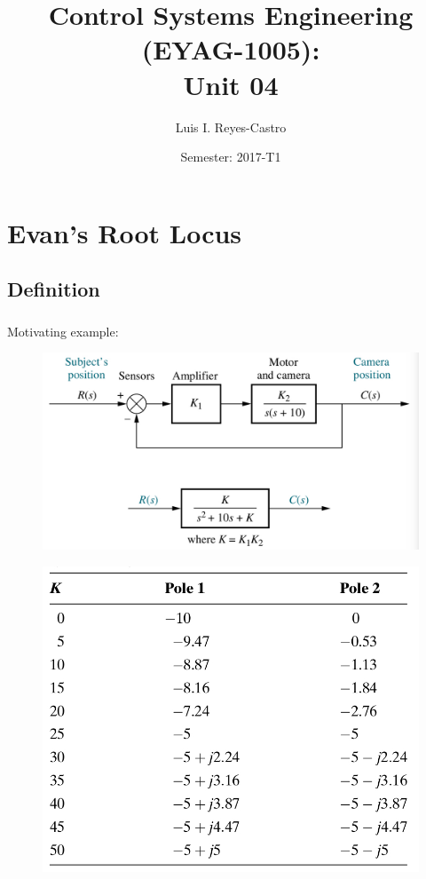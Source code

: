 \documentclass[ 10pt, xcolor = dvipsnames]{beamer}
\title[\shorttitle]{Control Systems Engineering (EYAG-1005): \\ \textbf{Unit 04} }
\author[L. I. Reyes-Castro]{Luis I. Reyes-Castro}
\institute[ESPOL]{\normalsize Escuela Superior Polit\'ecnica del Litoral (ESPOL) \\ Guayaquil - Ecuador}
\date[2017-T1]{Semester: 2017-T1}
\begin{document}



\section{Evan's Root Locus}

\subsection{Definition}

\begin{frame}[allowframebreaks]
\frametitle{\insertsection}

Motivating example: 
\fullskip

\begin{figure}
\centering
\includegraphics[width=0.68\columnwidth]{figures/Nise_Figure-8-4.jpg}
\end{figure}
\framebreak

\begin{figure}
\centering
\includegraphics[width=0.56\columnwidth]{figures/Nise_Table-8-1.jpg}
\end{figure}

\end{frame}
\end{document}
